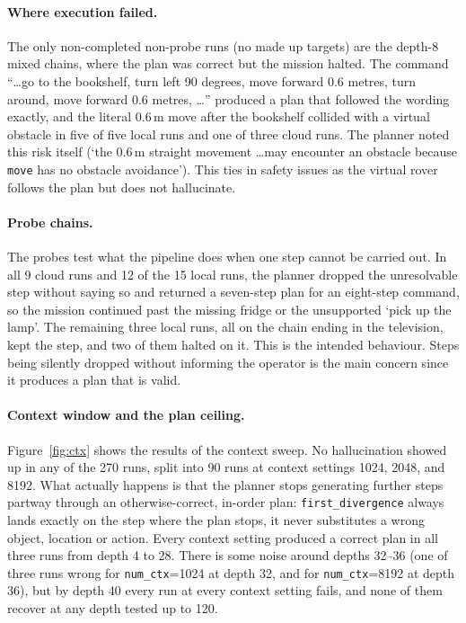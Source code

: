 \paragraph{Where execution failed.} The only non-completed non-probe runs (no made up targets) are 
the depth-8 mixed chains, where the plan was correct but the mission halted. 
The command ``\ldots go to the bookshelf, turn left 90 degrees, move forward 0.6 metres, 
turn around, move forward 0.6 metres, \ldots'' produced a plan that followed the wording exactly, 
and the literal 0.6\,m move after the bookshelf collided with a virtual obstacle in five of 
five local runs and one of three cloud runs. The planner noted this risk itself (`the 0.6\,m straight 
movement \ldots may encounter an obstacle because \texttt{move} has no obstacle avoidance'). 
This ties in safety issues as the virtual rover follows the plan but does not hallucinate. 


\paragraph{Probe chains.} The probes test what the pipeline does when one step cannot 
be carried out. In all 9 cloud runs and 12 of the 15 local runs, the planner dropped 
the unresolvable step without saying so and returned a seven-step plan for an eight-step command,
 so the mission continued past the missing fridge or the unsupported `pick up the lamp'. 
 The remaining three local runs, all on the chain ending in the television, kept the step, and 
 two of them halted on it. This is the intended behaviour. Steps being silently dropped without 
 informing the operator is the main concern since it produces a plan that is valid.

\paragraph{Context window and the plan ceiling.} 
Figure~\ref{fig:ctx} shows the results of the context sweep. No hallucination showed up in any
of the 270 runs, split into 90 runs at context settings 1024, 2048, and 8192. What actually happens is that
the planner stops generating further steps partway through an otherwise-correct,
in-order plan: \texttt{first\_divergence} always lands exactly on the step where
the plan stops, it never substitutes a wrong object, location or action. Every
context setting produced a correct plan in all three runs from depth 4 to 28.
There is some noise around depths 32--36 (one of three runs wrong for
\texttt{num\_ctx}=1024 at depth 32, and for \texttt{num\_ctx}=8192 at depth 36),
but by depth 40 every run at every context setting fails, and none of them
recover at any depth tested up to 120. 

